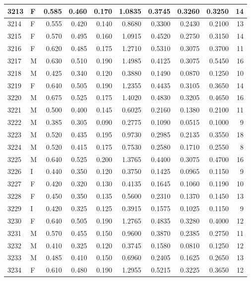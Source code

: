 \documentclass[9pt,twocolumn,twoside,]{pnas-new}
\begin{document}
\begin{tabular}{l|l|r|r|r|r|r|r|r|r}
\hline
3213 & F & 0.585 & 0.460 & 0.170 & 1.0835 & 0.3745 & 0.3260 & 0.3250 & 14\\
\hline
3214 & F & 0.555 & 0.420 & 0.140 & 0.8680 & 0.3300 & 0.2430 & 0.2100 & 13\\
\hline
3215 & F & 0.570 & 0.495 & 0.160 & 1.0915 & 0.4520 & 0.2750 & 0.3150 & 14\\
\hline
3216 & F & 0.620 & 0.485 & 0.175 & 1.2710 & 0.5310 & 0.3075 & 0.3700 & 11\\
\hline
3217 & M & 0.630 & 0.510 & 0.190 & 1.4985 & 0.4125 & 0.3075 & 0.5450 & 16\\
\hline
3218 & M & 0.425 & 0.340 & 0.120 & 0.3880 & 0.1490 & 0.0870 & 0.1250 & 10\\
\hline
3219 & F & 0.640 & 0.505 & 0.190 & 1.2355 & 0.4435 & 0.3105 & 0.3650 & 14\\
\hline
3220 & M & 0.675 & 0.525 & 0.175 & 1.4020 & 0.4830 & 0.3205 & 0.4650 & 16\\
\hline
3221 & M & 0.500 & 0.400 & 0.145 & 0.6025 & 0.2160 & 0.1380 & 0.2100 & 11\\
\hline
3222 & M & 0.385 & 0.305 & 0.090 & 0.2775 & 0.1090 & 0.0515 & 0.1000 & 9\\
\hline
3223 & M & 0.520 & 0.435 & 0.195 & 0.9730 & 0.2985 & 0.2135 & 0.3550 & 18\\
\hline
3224 & M & 0.520 & 0.415 & 0.175 & 0.7530 & 0.2580 & 0.1710 & 0.2550 & 8\\
\hline
3225 & M & 0.640 & 0.525 & 0.200 & 1.3765 & 0.4400 & 0.3075 & 0.4700 & 16\\
\hline
3226 & I & 0.440 & 0.350 & 0.120 & 0.3750 & 0.1425 & 0.0965 & 0.1150 & 9\\
\hline
3227 & F & 0.420 & 0.320 & 0.130 & 0.4135 & 0.1645 & 0.1060 & 0.1190 & 10\\
\hline
3228 & F & 0.450 & 0.350 & 0.135 & 0.5600 & 0.2310 & 0.1370 & 0.1450 & 13\\
\hline
3229 & I & 0.420 & 0.325 & 0.125 & 0.3915 & 0.1575 & 0.1025 & 0.1150 & 9\\
\hline
3230 & F & 0.640 & 0.505 & 0.190 & 1.2765 & 0.4835 & 0.3280 & 0.4000 & 12\\
\hline
3231 & M & 0.570 & 0.455 & 0.150 & 0.9600 & 0.3870 & 0.2385 & 0.2750 & 11\\
\hline
3232 & M & 0.410 & 0.325 & 0.120 & 0.3745 & 0.1580 & 0.0810 & 0.1250 & 12\\
\hline
3233 & M & 0.485 & 0.410 & 0.150 & 0.6960 & 0.2405 & 0.1625 & 0.2650 & 13\\
\hline
3234 & F & 0.610 & 0.480 & 0.190 & 1.2955 & 0.5215 & 0.3225 & 0.3650 & 12\\

\end{tabular}
\end{document}
